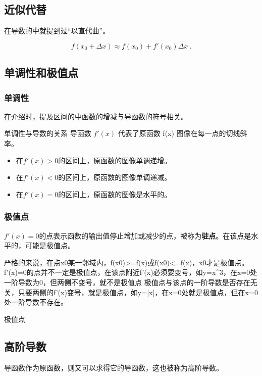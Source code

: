 \subsection{近似代替}

在导数的中就提到过“以直代曲”。

\begin{equation}
f(x_0+\Delta x)\approx f(x_0)+f'(x_0)\Delta x~.
\end{equation}

\subsection{单调性和极值点}
\subsubsection{单调性}
在介绍时，提及区间的中函数的增减与导函数的符号相关。
\begin{theorem}{单调性与导数的关系}
导函数  $f'(x)$  代表了原函数  f(x)  图像在每一点的切线斜率。
\begin{itemize}
\item 在$f'(x)>0$的区间上，原函数的图像单调递增。
\item 在$f'(x)<0$的区间上，原函数的图像单调递减。
\item 在$f'(x)=0$的区间上，原函数的图像是水平的。
\end{itemize}
\end{theorem}


\subsubsection{极值点}

$f'(x) = 0$的点表示函数的输出值停止增加或减少的点，被称为\textbf{驻点}。在该点是水平的，可能是极值点。

严格的来说，在点x0某一邻域内，f(x0)>=f(x)或f(x0)<=f(x)，x0才是极值点。
f’(x)=0的点并不一定是极值点，在该点附近f’(x)必须要变号，如y=x^3，在x=0处一阶导数为0，但两侧不变号，就不是极值点
极值点与该点的一阶导数是否存在无关，只要两侧的f’(x)变号，就是极值点，如y=|x|，在x=0处就是极值点，但在x=0处一阶导数不存在。

极值点

\subsection{高阶导数}

导函数作为原函数，则又可以求得它的导函数，这也被称为高阶导数。

